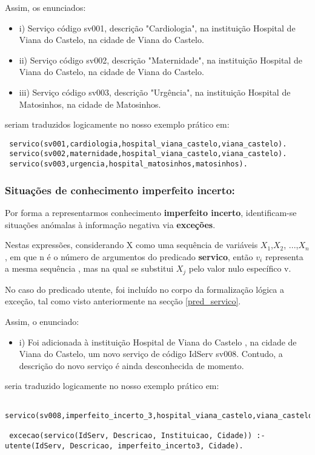 \documentclass[
  oneside,
  10pt, a4paper,
  footinclude=true,
  headinclude=true,
  cleardoublepage=empty
]{scrbook}
\begin{document}
Assim, os enunciados: 
\begin{itemize}
\item i) Serviço código sv001, descrição "Cardiologia", na instituição Hospital de Viana do Castelo, na cidade de Viana do Castelo.
\item ii) Serviço código sv002, descrição "Maternidade", na instituição Hospital de Viana do Castelo, na cidade de Viana do Castelo.
\item iii) Serviço código sv003, descrição "Urgência", na instituição Hospital de Matosinhos, na cidade de Matosinhos.
\end{itemize}

seriam traduzidos logicamente  no nosso exemplo prático em:
\begin{lstlisting}
 servico(sv001,cardiologia,hospital_viana_castelo,viana_castelo).
 servico(sv002,maternidade,hospital_viana_castelo,viana_castelo).
 servico(sv003,urgencia,hospital_matosinhos,matosinhos).
\end{lstlisting}


\subsubsection{\textbf{Situações de conhecimento imperfeito incerto:}}

Por forma a representarmos conhecimento \textbf{imperfeito incerto}, identificam-se situações anómalas à informação negativa via \textbf{exceções}.\par 
Nestas expressões, considerando X como uma sequência de variáveis $X_{1}$,$X_{2}$, ...,$X_{n}$, em que n é o número de argumentos do predicado \textbf{servico}, então $v_{i}$ representa a mesma sequência , mas na qual se substitui $X_{j}$ pelo valor nulo específico v.\par No caso do predicado utente, foi incluído no corpo da formalização lógica a exceção, tal como visto anteriormente na secção \ref{pred_servico}.\par 

Assim, o enunciado: 
\begin{itemize}
\item i) Foi adicionada à instituição Hospital de Viana do Castelo , na cidade de Viana do Castelo, um novo serviço de código IdServ sv008. Contudo, a descrição do novo serviço é ainda desconhecida de momento.
\end{itemize}

seria traduzido logicamente  no nosso exemplo prático em:
\begin{lstlisting}
 servico(sv008,imperfeito_incerto_3,hospital_viana_castelo,viana_castelo).
 
 excecao(servico(IdServ, Descricao, Instituicao, Cidade)) :- utente(IdServ, Descricao, imperfeito_incerto3, Cidade).
\end{lstlisting}
\end{document}
